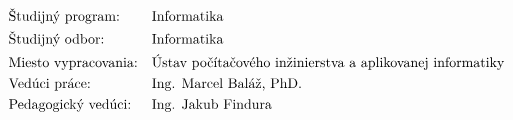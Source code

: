 \thispagestyle{empty}
{\centering
	{\large \University}\par
	{\large \Faculty}\par
	\vspace{\medskipamount}
	\RegNo
	\vfill
	\textbf{\large \Author}\par
	\vspace{1.5\bigskipamount}
	\textbf{\Large \Title}\par
	\vspace{1.5\bigskipamount}
	{\large \Thesis}\par
	\vfill
}
\begin{flushleft}
{\setlength{\mathindent}{0.1cm}
\begin{align*}
& \text{Študijný program:} && \text{\StudyProgramme} \\
& \text{Študijný odbor:} && \text{\StudyField} \\
& \text{Miesto vypracovania:} && \text{\Institute} \\
& \text{Vedúci práce:} && \text{\Supervisor} \\
& \text{Pedagogický vedúci:} && \text{\PedagogicalSupervisor}
\end{align*}}
\vspace{2\bigskipamount}
\Date
\end{flushleft}